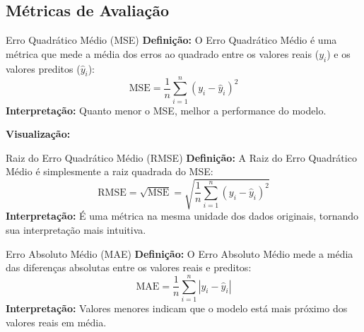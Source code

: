 \documentclass[]{beamer}
\begin{document}
\subsection{Métricas de Avaliação}

\begin{frame}{Erro Quadrático Médio (MSE)}
    \textbf{Definição:}
    O Erro Quadrático Médio é uma métrica que mede a média dos erros ao quadrado entre os valores reais ($y_i$) e os valores preditos ($\hat{y}_i$):
    \begin{equation}
        \text{MSE} = \frac{1}{n} \sum_{i=1}^{n} (y_i - \hat{y}_i)^2
    \end{equation}
    \textbf{Interpretação:} Quanto menor o MSE, melhor a performance do modelo.

    \vspace{0.3cm}
    \textbf{Visualização:}
\end{frame}


\begin{frame}{Raiz do Erro Quadrático Médio (RMSE)}
    \textbf{Definição:}
    A Raiz do Erro Quadrático Médio é simplesmente a raiz quadrada do MSE:
    \begin{equation}
        \text{RMSE} = \sqrt{\text{MSE}} = \sqrt{\frac{1}{n} \sum_{i=1}^{n} (y_i - \hat{y}_i)^2}
    \end{equation}
    \textbf{Interpretação:} É uma métrica na mesma unidade dos dados originais, tornando sua interpretação mais intuitiva.
\end{frame}

\begin{frame}{Erro Absoluto Médio (MAE)}
    \textbf{Definição:}
    O Erro Absoluto Médio mede a média das diferenças absolutas entre os valores reais e preditos:
    \begin{equation}
        \text{MAE} = \frac{1}{n} \sum_{i=1}^{n} |y_i - \hat{y}_i|
    \end{equation}
    \textbf{Interpretação:} Valores menores indicam que o modelo está mais próximo dos valores reais em média.
\end{frame}
\end{document}
